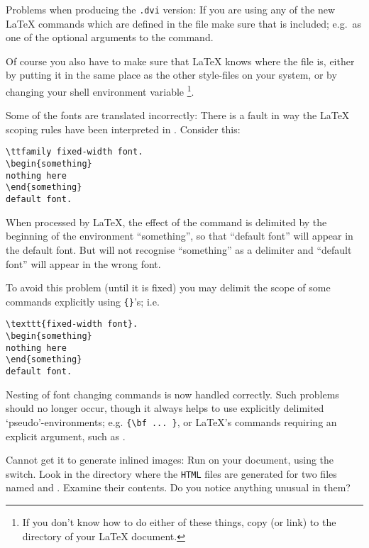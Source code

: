 \begin{htmllist}
\item [Problems when producing the \texttt{.dvi} version: \label{htmlsty}]
If you are using any of the new \LaTeX{} commands which are defined in 
the  file make sure that  is included;
e.g.\ as one of the optional arguments to the  command.

Of course you also have to make sure that \LaTeX{} knows where the 
file is, either by putting it in the same place as the other style-files on
your system, or by changing your  shell environment variable
\footnote{If you don't know how to do either of these things, copy (or
link)  to the directory of your \LaTeX{} document.}.

\item [Some of the fonts are translated incorrectly: ]
There is a fault in way the \LaTeX{} scoping rules have been 
interpreted in \latextohtml. Consider this:
\begin{small}
\begin{verbatim}
\ttfamily fixed-width font.
\begin{something}
nothing here
\end{something}
default font.
\end{verbatim}
\end{small}
When processed by \LaTeX, the effect of the  command is
delimited by the beginning of the environment ``something'',
so that ``default font'' will appear in the default font. 
But \latextohtml{} will not recognise
``something'' as a delimiter and ``default font'' will appear in the
wrong font. 

To avoid this problem (until it is fixed) you may delimit the scope of
some commands explicitly using \verb|{}|'s; i.e.
\begin{small}
\begin{verbatim}
\texttt{fixed-width font}.
\begin{something}
nothing here
\end{something}
default font.
\end{verbatim}
\end{small}


Nesting of font changing commands is now handled correctly.
Such problems should no longer occur, though it always helps
to use explicitly delimited `pseudo'-environments; e.g.
\verb|{\bf ... }|, or \LaTeX's commands requiring an explicit argument,
such as .


\item [Cannot get it to generate inlined images: ]
Run \latextohtml{} on your document, using the  switch.
Look in the directory where the \texttt{HTML} files are generated
for two files named  and .
Examine their contents.
Do you notice anything unusual in them?


\end{htmllist}
